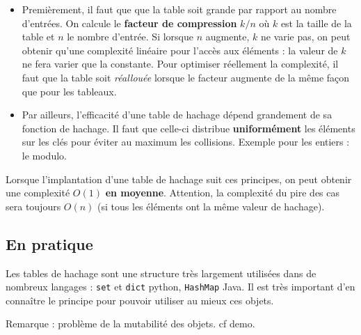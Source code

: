 \documentclass{../cours}
\begin{document}
\begin{itemize}
\item Premièrement, il faut que que la table soit grande par rapport au nombre d'entrées. On calcule le \textbf{facteur de compression} $k/n$ où $k$ est la taille de la table et $n$ le nombre d'entrée. Si lorsque $n$ augmente, $k$ ne varie pas, on peut obtenir qu'une complexité linéaire pour l'accès aux éléments : la valeur de $k$ ne fera varier que la constante. Pour optimiser réellement la complexité, il faut que la table soit \emph{réallouée} lorsque le facteur augmente de la même façon que pour les tableaux.

\item Par ailleurs, l'efficacité d'une table de hachage dépend grandement de sa fonction de hachage. Il faut que celle-ci distribue \textbf{uniformément} les éléments sur les clés pour éviter au maximum les collisions. Exemple pour les entiers : le modulo.
\end{itemize}

Lorsque l'implantation d'une table de hachage suit ces principes, on peut obtenir une complexité $O(1)$ \textbf{en moyenne}. Attention, la complexité du pire des cas sera toujours $O(n)$ (si tous les éléments ont la même valeur de hachage).

\subsection{En pratique}

Les tables de hachage sont une structure très largement utilisées dans de nombreux langages : {\tt set} et {\tt dict} python, {\tt HashMap} Java. Il est très important d'en connaître le principe pour pouvoir utiliser au mieux ces objets.

Remarque : problème de la mutabilité des objets. cf demo.
\end{document}
